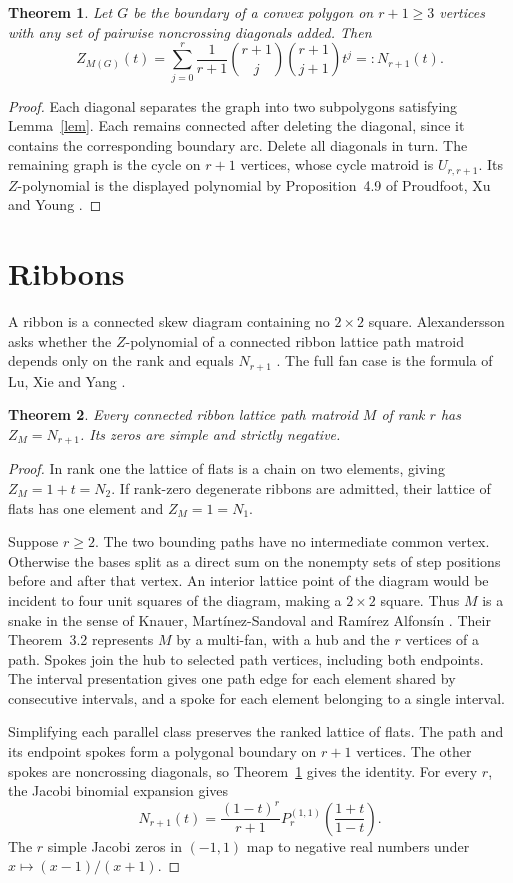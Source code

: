 \documentclass[11pt]{article}
\newtheorem{theorem}{Theorem}
\begin{document}
\begin{theorem}\label{polygon}
Let $G$ be the boundary of a convex polygon on $r+1\ge3$ vertices with
any set of pairwise noncrossing diagonals added. Then
\[
 Z_{M(G)}(t)=\sum_{j=0}^r \frac{1}{r+1}
        \binom{r+1}{j}\binom{r+1}{j+1}t^j=:N_{r+1}(t).
\]
\end{theorem}
\begin{proof}
Each diagonal separates the graph into two subpolygons satisfying
Lemma~\ref{lem}. Each remains connected after deleting the diagonal,
since it contains the corresponding boundary arc. Delete all diagonals
in turn. The remaining graph is the cycle on $r+1$ vertices, whose cycle
matroid is $U_{r,r+1}$. Its $Z$-polynomial is the displayed polynomial by
Proposition~4.9 of Proudfoot, Xu and Young \cite{pxy}.
\end{proof}

\section{Ribbons}
A ribbon is a connected skew diagram containing no $2\times2$ square.
Alexandersson asks whether the $Z$-polynomial of a connected ribbon
lattice path matroid depends only on the rank and equals $N_{r+1}$
\cite{alex}. The full fan case is the formula of Lu, Xie and Yang \cite{lxy}.

\begin{theorem}
Every connected ribbon lattice path matroid $M$ of rank $r$ has
$Z_M=N_{r+1}$. Its zeros are simple and strictly negative.
\end{theorem}
\begin{proof}
In rank one the lattice of flats is a chain on two elements, giving
$Z_M=1+t=N_2$. If rank-zero degenerate ribbons are admitted, their
lattice of flats has one element and $Z_M=1=N_1$.

Suppose $r\ge2$. The two bounding paths have no intermediate common
vertex. Otherwise the bases split as a direct sum on the nonempty sets
of step positions before and after that vertex. An interior lattice
point of the diagram would be incident to four unit squares of the
diagram, making a $2\times2$ square. Thus $M$ is a snake in the sense of
Knauer, Mart\'inez-Sandoval and Ram\'irez Alfons\'in \cite{kmr}. Their
Theorem~3.2 represents $M$ by a multi-fan, with a hub and the $r$
vertices of a path. Spokes join the hub to selected path vertices,
including both endpoints. The interval presentation gives one path
edge for each element shared by consecutive intervals, and a spoke
for each element belonging to a single interval.

Simplifying each parallel class preserves the ranked lattice of flats.
The path and its endpoint spokes form a polygonal boundary on $r+1$
vertices. The other spokes are noncrossing diagonals, so
Theorem~\ref{polygon} gives the identity. For every $r$, the Jacobi
binomial expansion gives
\[
 N_{r+1}(t)=\frac{(1-t)^r}{r+1}
 P_r^{(1,1)}\!\left(\frac{1+t}{1-t}\right).
\]
The $r$ simple Jacobi zeros in $(-1,1)$ map to negative real numbers
under $x\mapsto(x-1)/(x+1)$.
\end{proof}
\end{document}
